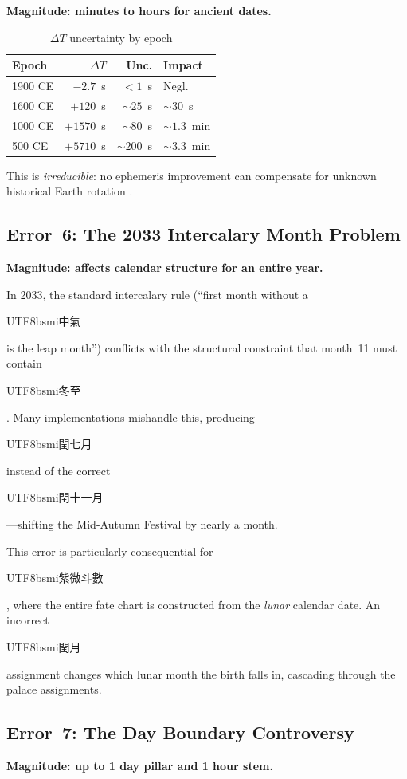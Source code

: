 \documentclass[10pt,a4paper]{article}
\newcommand{\zh}[1]{\begin{CJK}{UTF8}{bsmi}#1\end{CJK}}
\begin{document}
\textbf{Magnitude: minutes to hours for ancient dates.}

\begin{table}[H]
\centering
\caption{$\Delta T$ uncertainty by epoch}
\label{tab:deltaT}
\footnotesize
\begin{tabular}{lrrl}
\toprule
\textbf{Epoch} & $\Delta T$ & \textbf{Unc.} & \textbf{Impact} \\
\midrule
1900 CE & $-2.7$~s & $<1$~s & Negl. \\
1600 CE & $+120$~s & $\sim 25$~s & $\sim 30$~s \\
1000 CE & $+1570$~s & $\sim 80$~s & $\sim 1.3$~min \\
500 CE & $+5710$~s & $\sim 200$~s & $\sim 3.3$~min \\
\bottomrule
\end{tabular}
\end{table}

This is \emph{irreducible}: no ephemeris improvement can compensate for
unknown historical Earth rotation \cite{stephenson2016}.

\subsection{Error~6: The 2033 Intercalary Month Problem}
\label{subsec:error_2033}

\textbf{Magnitude: affects calendar structure for an entire year.}

In 2033, the standard intercalary rule (``first month without a \zh{中氣}
is the leap month'') conflicts with the structural constraint that month~11
must contain \zh{冬至} \cite{aslaksen2010, wikipedia_2033}. Many
implementations mishandle this, producing \zh{閏七月} instead of the
correct \zh{閏十一月} \cite{aslaksen_fake}---shifting the Mid-Autumn
Festival by nearly a month.

This error is particularly consequential for \zh{紫微斗數}, where the
entire fate chart is constructed from the \emph{lunar} calendar date.
An incorrect \zh{閏月} assignment changes which lunar month the birth
falls in, cascading through the palace assignments.

\subsection{Error~7: The Day Boundary Controversy}
\label{subsec:error_zishi}

\textbf{Magnitude: up to 1 day pillar and 1 hour stem.}
\end{document}
